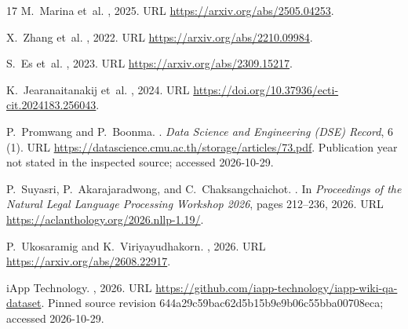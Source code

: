 \documentclass[10pt,a4paper]{article}
\begin{document}
\begin{thebibliography}{17}
M.~Marina et~al.
,
  2025.
\newblock URL \url{https://arxiv.org/abs/2505.04253}.

X.~Zhang et~al.
, 2022.
\newblock URL \url{https://arxiv.org/abs/2210.09984}.

S.~Es et~al.
,
  2023.
\newblock URL \url{https://arxiv.org/abs/2309.15217}.

K.~Jearanaitanakij et~al.
,
  2024.
\newblock URL \url{https://doi.org/10.37936/ecti-cit.2024183.256043}.

P.~Promwang and P.~Boonma.
.
\newblock \emph{Data Science and Engineering (DSE) Record}, 6 (1).
\newblock URL \url{https://datascience.cmu.ac.th/storage/articles/73.pdf}.
\newblock Publication year not stated in the inspected source; accessed
  2026-10-29.

P.~Suyasri, P.~Akarajaradwong, and C.~Chaksangchaichot.
.
\newblock In \emph{Proceedings of the Natural Legal Language Processing
  Workshop 2026}, pages 212--236, 2026.
\newblock URL \url{https://aclanthology.org/2026.nllp-1.19/}.

P.~Ukosaramig and K.~Viriyayudhakorn.
,
  2026.
\newblock URL \url{https://arxiv.org/abs/2608.22917}.

{iApp Technology}.
, 2026.
\newblock URL \url{https://github.com/iapp-technology/iapp-wiki-qa-dataset}.
\newblock Pinned source revision 644a29c59bac62d5b15b9e9b06c55bba00708eca;
  accessed 2026-10-29.

\end{thebibliography}
\end{document}
